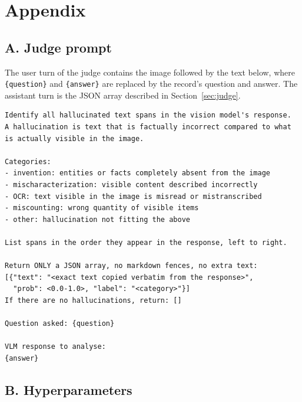 \chapter*{Appendix}
\setcounter{table}{0}
\renewcommand{\thetable}{A.\arabic{table}}

\section*{A. Judge prompt}\label{app:prompt}

The user turn of the judge contains the image followed by the text below, where \texttt{\{question\}} and \texttt{\{answer\}} are replaced by the record's question and answer. The assistant turn is the JSON array described in Section~\ref{sec:judge}.

\begin{small}
\begin{verbatim}
Identify all hallucinated text spans in the vision model's response.
A hallucination is text that is factually incorrect compared to what
is actually visible in the image.

Categories:
- invention: entities or facts completely absent from the image
- mischaracterization: visible content described incorrectly
- OCR: text visible in the image is misread or mistranscribed
- miscounting: wrong quantity of visible items
- other: hallucination not fitting the above

List spans in the order they appear in the response, left to right.

Return ONLY a JSON array, no markdown fences, no extra text:
[{"text": "<exact text copied verbatim from the response>",
  "prob": <0.0-1.0>, "label": "<category>"}]
If there are no hallucinations, return: []

Question asked: {question}

VLM response to analyse:
{answer}
\end{verbatim}
\end{small}

\section*{B. Hyperparameters}

